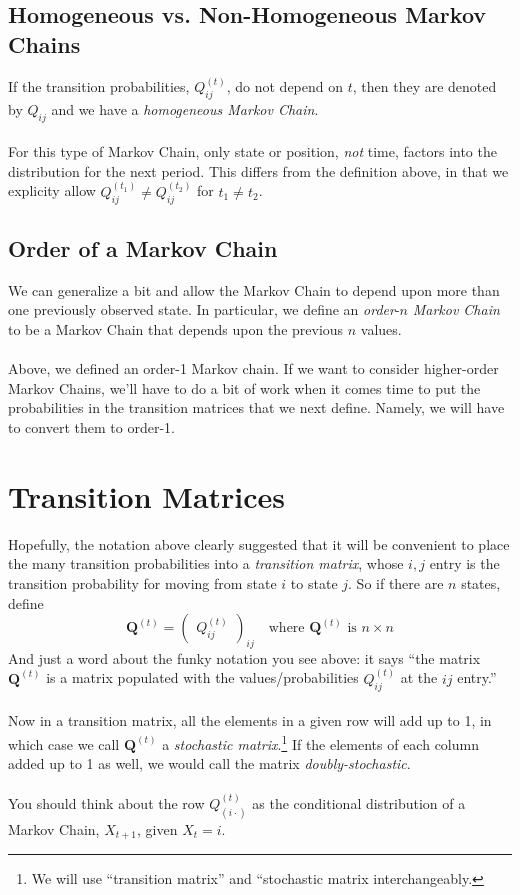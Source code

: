 \documentclass[a4paper,12pt]{scrartcl}
\begin{document}
\subsection{Homogeneous vs. Non-Homogeneous Markov Chains}
If the transition probabilities, $Q^{(t)}_{ij}$, do
not depend on $t$, then they are denoted by $Q_{ij}$ and we have
a {\sl homogeneous Markov Chain}. 
\\
\\
For this type of Markov Chain, 
only state or position, \emph{not} time, factors into the distribution for the
next period. This differs from the definition above, in that we 
explicity allow $Q_{ij}^{(t_1)} \neq Q_{ij}^{(t_2)}$ for 
$t_1\neq t_2$.

\subsection{Order of a Markov Chain}
We can generalize a bit and allow the Markov Chain to depend upon more
than one previously observed state.  In particular, we define an 
{\sl order}-${n}$ {\sl Markov Chain} to be a Markov Chain that 
depends upon the previous $n$ values.  
\\
\\
Above, we defined an order-1 Markov chain. If we want to consider 
higher-order Markov Chains, we'll have to do a bit of work when it
comes time to put the probabilities in the transition matrices that
we next define. Namely, we will have to convert them to order-1.

\newpage
\section{Transition Matrices}

Hopefully, the notation above clearly suggested that it will be
convenient to place the many transition probabilities into a
{\sl transition matrix}, whose $i,j$ entry is the transition
probability for moving from state $i$ to state $j$. So if 
there are $n$ states, define
\[\mathbf{Q}^{(t)}=\begin{pmatrix} Q_{ij}^{(t)} \end{pmatrix}_{ij}
    \quad \text{where $\mathbf{Q}^{(t)}$ is $n\times n$} \]
And just a word about the funky notation you see above: it says
``the matrix $\mathbf{Q}^{(t)}$ is a matrix populated
with the values/probabilities $Q_{ij}^{(t)}$ at the $ij$ 
entry.'' 
\\
\\
Now in a transition matrix, all the elements in a given row will add up
to 1, in which case we call $\mathbf{Q}^{(t)}$ a 
{\sl stochastic matrix}.\footnote{We will use 
``transition matrix'' and ``stochastic matrix interchangeably.}
If the elements of each column added up to 1 as well, we would call
the matrix {\sl doubly-stochastic}.
\\
\\
You should think about the row $Q_{(i\cdot)}^{(t)}$ as the 
conditional distribution of a Markov Chain, $X_{t+1}$, given
$X_t = i$.
\end{document}
